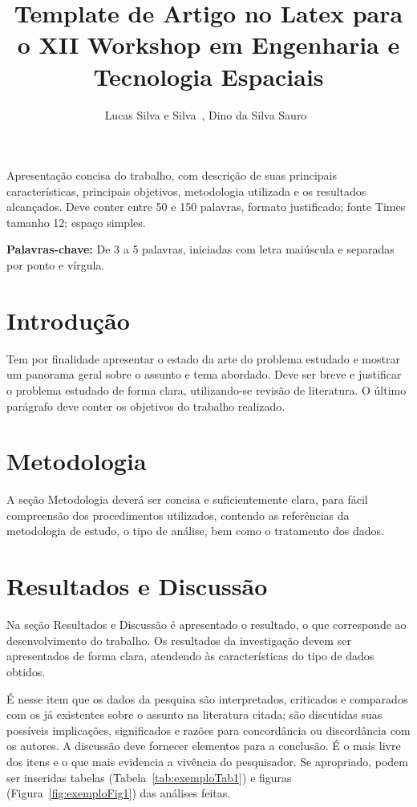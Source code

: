 \documentclass[12pt]{article}
\title{Template de Artigo no Latex para o XII Workshop em Engenharia e Tecnologia Espaciais}
\author{Lucas Silva e Silva~\inst{1}, Dino da Silva Sauro~\inst{2}}
\begin{document}
\maketitle

\begin{resumo}
Apresentação concisa do trabalho, com descrição de suas principais características, principais objetivos, metodologia utilizada e os resultados alcançados. Deve conter entre 50 e 150 palavras, formato justificado; fonte Times tamanho 12; espaço simples.
\end{resumo}
\hrulefill

\begin{flushleft}
\textbf{Palavras-chave:} De 3 a 5 palavras, iniciadas com letra maiúscula e separadas por ponto e vírgula.
\end{flushleft}

\section{Introdução}

Tem por finalidade apresentar o estado da arte do problema estudado e mostrar um panorama geral sobre o assunto e tema abordado. Deve ser breve e justificar o problema estudado de forma clara, utilizando-se revisão de literatura. O último parágrafo deve conter os objetivos do trabalho realizado.

\section{Metodologia} \label{sec:met}

A seção Metodologia deverá ser concisa e suficientemente clara, para fácil compreensão dos procedimentos utilizados, contendo as referências da metodologia de estudo, o tipo de análise, bem como o tratamento dos dados.

\section{Resultados e Discussão}

Na seção Resultados e Discussão é apresentado o resultado, o que corresponde ao desenvolvimento do trabalho. Os resultados da investigação devem ser apresentados de forma clara, atendendo às características do tipo de dados obtidos. 

É nesse item que os dados da pesquisa são interpretados, criticados e comparados com os já existentes sobre o assunto na literatura citada; são discutidas suas possíveis implicações, significados e razões para concordância ou discordância com os autores. A discussão deve fornecer elementos para a conclusão. É o mais livre dos itens e o que mais evidencia a vivência do pesquisador. Se apropriado, podem ser inseridas tabelas (Tabela~\ref{tab:exemploTab1}) e figuras (Figura~\ref{fig:exemploFig1}) das análises feitas.
\end{document}

